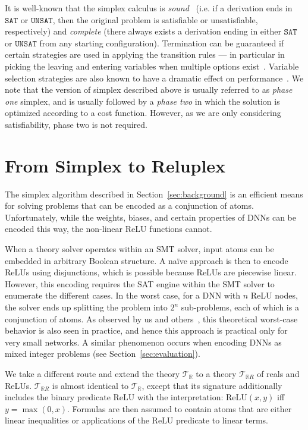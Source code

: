 \documentclass[a4paper]{llncs}
\newcommand{\relu}{\text{ReLU}\xspace{}}
\newcommand{\tr}{\mathcal{T}_{\mathbb{R}}}
\newcommand{\trr}{\mathcal{T}_{\mathbb{R}R}}
\newcommand{\sat}{\texttt{SAT}}
\newcommand{\unsat}{\texttt{UNSAT}}
\begin{document}
It is well-known that the simplex calculus 
 is \emph{sound}~\cite{Va96} (i.e. if a derivation ends in $\sat{}$ or $\unsat{}$, then the original problem is satisfiable or unsatisfiable,
respectively) and \emph{complete} (there always exists a derivation
ending in either $\sat{}$
or $\unsat{}$ from any starting configuration).
Termination can be guaranteed if certain strategies are
used in applying the transition rules --- in particular in
picking the leaving and entering variables when 
 multiple options exist~\cite{Va96}. Variable selection strategies are also known to have a
dramatic effect on performance~\cite{Va96}. We note that the version of
simplex described above is usually referred to as \emph{phase one}
simplex, and is usually followed by a \emph{phase two} in which the
solution is optimized according to a cost
function. However, as we are only considering satisfiability,
phase two is not required.

\section{From Simplex to Reluplex}
\label{sec:reluplex}

The simplex
algorithm described in Section~\ref{sec:background} is an efficient
means for solving 
problems that can be encoded as a conjunction of atoms.
Unfortunately, while the weights, biases, and certain properties
of DNNs can be encoded this way, the non-linear ReLU functions cannot. 

When a theory solver operates within an SMT solver, input
atoms can be embedded in arbitrary Boolean structure.
 A na\"ive approach is then to encode ReLUs using disjunctions, which is
 possible because ReLUs are piecewise linear.
However, this encoding requires the
SAT engine within the SMT solver to enumerate the different cases. In the worst
case, for a DNN with $n$ ReLU nodes, the solver ends up splitting the problem
into $2^n$ sub-problems, each of which is a conjunction of atoms.
As observed by us and
others~\cite{BaIoLaVyNoCr16,HuKwWaWu16}, this theoretical worst-case behavior is
also seen in practice, and hence this approach is practical only for
very small networks.  A
similar phenomenon occurs when encoding DNNs as mixed integer
problems (see Section~\ref{sec:evaluation}).

We take a different route and extend the theory $\tr{}$ to a theory $\trr{}$ of reals and
ReLUs.  $\trr{}$ is almost identical to $\tr{}$, except that its signature
additionally includes the binary predicate $\relu{}$ with the interpretation:
$\relu{}(x,y)$ iff $y=\max{}(0,x)$.  Formulas are then assumed to contain atoms that
are either linear inequalities or applications of the $\relu{}$ predicate to
linear terms.
\end{document}
